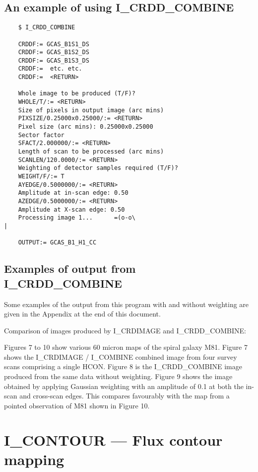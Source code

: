 \subsection{An example of using I\_CRDD\_COMBINE}

\begin{verbatim}
    $ I_CRDD_COMBINE

    CRDDF:= GCAS_B1S1_DS 
    CRDDF:= GCAS_B1S2_DS 
    CRDDF:= GCAS_B1S3_DS 
    CRDDF:=  etc. etc.
    CRDDF:=  <RETURN>

    Whole image to be produced (T/F)? 
    WHOLE/T/:= <RETURN>
    Size of pixels in output image (arc mins) 
    PIXSIZE/0.25000x0.25000/:= <RETURN>
    Pixel size (arc mins): 0.25000x0.25000
    Sector factor 
    SFACT/2.000000/:= <RETURN>          
    Length of scan to be processed (arc mins) 
    SCANLEN/120.0000/:= <RETURN>        
    Weighting of detector samples required (T/F)? 
    WEIGHT/F/:= T                                      
    AYEDGE/0.5000000/:= <RETURN>       
    Amplitude at in-scan edge: 0.50 
    AZEDGE/0.5000000/:= <RETURN>      
    Amplitude at X-scan edge: 0.50 
    Processing image 1...      =(o-o\                                         |

    OUTPUT:= GCAS_B1_H1_CC     
\end{verbatim}

\subsection{Examples of output from I\_CRDD\_COMBINE}

   Some examples of the output from this program with and without weighting
are given in the Appendix at the end of this document.

Comparison of images produced by I\_CRDIMAGE and I\_CRDD\_COMBINE:

Figures 7 to 10 show various 60 micron maps of the spiral galaxy M81. 
Figure 7 shows the I\_CRDIMAGE / I\_COMBINE combined image from four survey
scans comprising a single HCON. 
Figure 8 is the I\_CRDD\_COMBINE image produced from the same data without
weighting. 
Figure 9 shows the image obtained by applying Gaussian weighting with an 
amplitude of 0.1 at both the in-scan and cross-scan edges.
This compares favourably with the map from a pointed observation of M81 shown in
Figure 10.

\pagebreak

\section{I\_CONTOUR --- Flux contour mapping}

